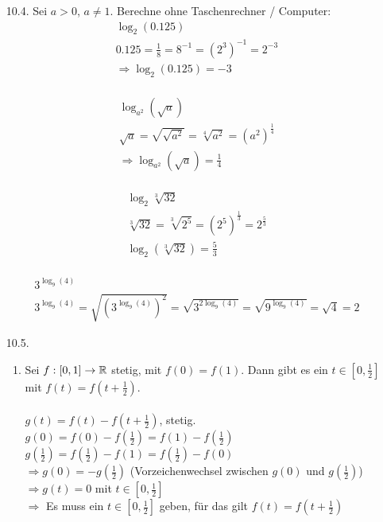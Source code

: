 \documentclass{HM}
\begin{document}
\begin{enumerate}
\newpage
\item [10.4.] Sei $a > 0$, $ a \neq 1$. Berechne ohne Taschenrechner / Computer:\\

\begin{align*}
	\log_2 (0.125)\\
	0.125=\frac{1}{8}=8^{-1}=(2^3)^{-1}=2^{-3}\\
	\Rightarrow \log_2 (0.125) = -3
\end{align*}\\
\begin{align*}
	\log_{a^2}(\sqrt{a})\\
	\sqrt{a}=\sqrt{\sqrt{a^2}}=\sqrt[4]{a^2}=(a^2)^\frac{1}{4}\\
	\Rightarrow \log_{a^2}(\sqrt{a}) = \frac{1}{4}
\end{align*}\\
\begin{align*}
	\log_2\sqrt[3]{32}\\
	\sqrt[3]{32}=\sqrt[3]{2^5}=(2^5)^\frac{1}{3}=2^\frac{5}{3}\\
	\log_2(\sqrt[3]{32}) = \frac{5}{3}	
\end{align*}\\
\begin{align*}
	3^{\log_9 (4)}\\
	3^{\log_9 (4)} = \sqrt{(3^{\log_9 (4)})^2} = \sqrt{3^{2\log_9 (4)}} = \sqrt{9^{\log_9 (4)}} = \sqrt{4} = 2
\end{align*}

\item [10.5.]
\begin{enumerate}
	\item Sei $f: [0,1] \to\mathbb{R}$ stetig, mit $f(0)=f(1)$. Dann gibt es ein $t\in[0,\frac{1}{2}]$ mit $f(t)=f(t+\frac{1}{2})$.\\\\
	$g(t)=f(t)-f(t+\frac{1}{2})$, stetig.\\
	
	$g(0)=f(0)-f(\frac{1}{2})=f(1)-f(\frac{1}{2})$\\
	$g(\frac{1}{2})=f(\frac{1}{2})-f(1)=f(\frac{1}{2})-f(0)$\\
	$\Rightarrow g(0)=-g(\frac{1}{2})$ (Vorzeichenwechsel zwischen $g(0)$ und $g(\frac{1}{2})$)\\
	
	$\Rightarrow g(t)=0$ mit $t\in[0,\frac{1}{2}]$\\
	$\Rightarrow$ Es muss ein $t\in[0,\frac{1}{2}]$ geben, für das gilt $f(t)=f(t+\frac{1}{2})$\\
	

\end{enumerate}
\end{enumerate}
\end{document}
